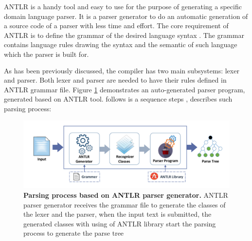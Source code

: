 ANTLR is a handy tool and easy to use for the purpose of generating a specific domain language parser. It is a parser generator to do an automatic generation of a source code of a parser with less time and effort. The core requirement of ANTLR is to define the grammar of the desired language syntax . The grammar contains language rules  drawing the syntax and the semantic of such  language which the parser is built for. 
\par
 As has been previously discussed, the compiler has two main subsystems: lexer and parser. Both lexer and parser are needed to have their rules defined in ANTLR grammar file.  {Figure \ref{Fig:ANTLR}} demonstrates an auto-generated parser program, generated based on ANTLR tool. follows is a sequence steps \citealp{ANTLR:Tool:Online}, describes such parsing process:

\begin{figure}[td]
	\begin{center}
		\includegraphics[scale=0.6]{images/ANTLR}
		\caption{\textbf{Parsing process based on ANTLR parser generator.} ANTLR parser generator receives the grammar file to generate the classes of the lexer and the parser, when the input text is submitted, the generated classes with using of ANTLR library start the parsing process to generate the parse tree}
		\label{Fig:ANTLR}
	\end{center}
\end{figure}


